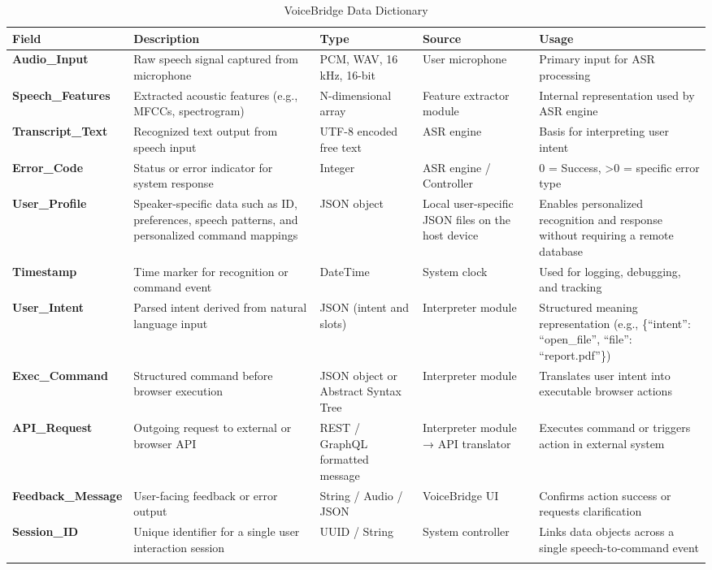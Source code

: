 \documentclass[11pt]{article}
\begin{document}
\begin{table}[H]
\centering
\footnotesize

\begin{tabularx}{\textwidth}{p{3cm} p{4cm} X  X p{4cm}}
\toprule
\textbf{Field} & \textbf{Description} & \textbf{Type} & \textbf{Source} & \textbf{Usage} \\
\midrule
\textbf{Audio\_Input} & Raw speech signal captured from microphone & PCM, WAV, 16 kHz, 16-bit & User microphone & Primary input for ASR processing \\
\hline
\textbf{Speech\_Features} & Extracted acoustic features (e.g., MFCCs, spectrogram) & N-dimensional array & Feature extractor module & Internal representation used by ASR engine \\
\hline
\textbf{Transcript\_Text} & Recognized text output from speech input & UTF-8 encoded free text & ASR engine & Basis for interpreting user intent \\
\hline
\textbf{Error\_Code} & Status or error indicator for system response & Integer & ASR engine / Controller & 0 = Success, >0 = specific error type \\
\hline
\textbf{User\_Profile} & Speaker-specific data such as ID, preferences, speech patterns, and personalized command mappings & JSON object & Local user-specific JSON files on the host device & Enables personalized recognition and response without requiring a remote database \\
\hline
\textbf{Timestamp} & Time marker for recognition or command event & DateTime & System clock & Used for logging, debugging, and tracking \\
\hline
\textbf{User\_Intent} & Parsed intent derived from natural language input & JSON (intent and slots) & Interpreter module & Structured meaning representation (e.g., \{“intent”: “open\_file”, “file”: “report.pdf”\}) \\
\hline
\textbf{Exec\_Command} & Structured command before browser execution & JSON object or Abstract Syntax Tree & Interpreter module & Translates user intent into executable browser actions \\
\hline
\textbf{API\_Request} & Outgoing request to external or browser API & REST / GraphQL formatted message & Interpreter module → API translator & Executes command or triggers action in external system \\
\hline
\textbf{Feedback\_Message} & User-facing feedback or error output & String / Audio / JSON & VoiceBridge UI & Confirms action success or requests clarification \\
\hline
\textbf{Session\_ID} & Unique identifier for a single user interaction session & UUID / String & System controller & Links data objects across a single speech-to-command event \\
\bottomrule
\caption{VoiceBridge Data Dictionary}
\label{tab:data-dictionary}
\end{tabularx}
\end{table}
\end{document}
